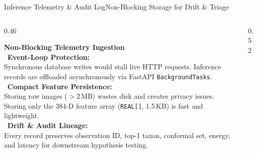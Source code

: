 \documentclass[aspectratio=169,10pt]{beamer}
\begin{document}
\begin{frame}{Inference Telemetry \& Audit Log}{Non-Blocking Storage for Drift \& Triage}
    \begin{columns}[T]
        \begin{column}{0.46\textwidth}
            \begin{card}
                \raggedright\footnotesize
                \textbf{\color{BlueAccent} Non-Blocking Telemetry Ingestion}\\[3pt]
                \textbullet\ \textbf{Event-Loop Protection:}\\
                Synchronous database writes would stall live HTTP requests. Inference records are offloaded asynchronously via FastAPI \texttt{BackgroundTasks}.\\[3pt]
                \textbullet\ \textbf{Compact Feature Persistence:}\\
                Storing raw images ($>2$\,MB) wastes disk and creates privacy issues. Storing only the 384-D feature array (\texttt{REAL[]}, 1.5\,KB) is fast and lightweight.\\[3pt]
                \textbullet\ \textbf{Drift \& Audit Lineage:}\\
                Every record preserves observation ID, top-1 taxon, conformal set, energy, and latency for downstream hypothesis testing.
            \end{card}
        \end{column}

        \begin{column}{0.52\textwidth}
            \centering
\end{column}
\end{columns}
\end{frame}
\end{document}
